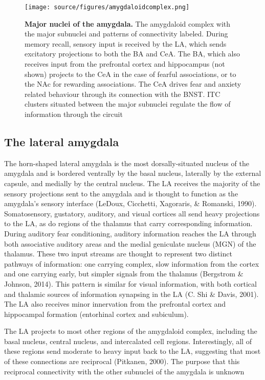 \documentclass[12pt,a4paperpaper,]{report}
\begin{document}
\begin{figure}[htbp]
\centering
\texttt{[image: source/figures/amygdaloidcomplex.png]}
\caption{\textbf{Major nuclei of the amygdala.} The amygdaloid complex
with the major subnuclei and patterns of connectivity labeled. During
memory recall, sensory input is received by the LA, which sends
excitatory projections to both the BA and CeA. The BA, which also
receives input from the prefrontal cortex and hippocampus (not shown)
projects to the CeA in the case of fearful associations, or to the NAc
for rewarding associations. The CeA drives fear and anxiety related
behaviour through its connection with the BNST. ITC clusters situated
between the major subnuclei regulate the flow of information through the
circuit \label{ref_a_figure}}
\end{figure}

\subsection{The lateral amygdala}\label{the-lateral-amygdala}

The horn-shaped lateral amygdala is the most dorsally-situated nucleus
of the amygdala and is bordered ventrally by the basal nucleus,
laterally by the external capsule, and medially by the central nucleus.
The LA receives the majority of the sensory projections sent to the
amygdala and is thought to function as the amygdala's sensory interface
(LeDoux, Cicchetti, Xagoraris, \& Romanski, 1990). Somatosensory,
gustatory, auditory, and visual cortices all send heavy projections to
the LA, as do regions of the thalamus that carry corresponding
information. During auditory fear conditioning, auditory information
reaches the LA through both associative auditory areas and the medial
geniculate nucleus (MGN) of the thalamus. These two input streams are
thought to represent two distinct pathways of information: one carrying
complex, slow information from the cortex and one carrying early, but
simpler signals from the thalamus (Bergstrom \& Johnson, 2014). This
pattern is similar for visual information, with both cortical and
thalamic sources of information synapsing in the LA (C. Shi \& Davis,
2001). The LA also receives minor innervation from the prefrontal cortex
and hippocampal formation (entorhinal cortex and subiculum).

The LA projects to most other regions of the amygdaloid complex,
including the basal nucleus, central nucleus, and intercalated cell
regions. Interestingly, all of these regions send moderate to heavy
input back to the LA, suggesting that most of these connections are
reciprocal (Pitkanen, 2000). The purpose that this reciprocal
connectivity with the other subnuclei of the amygdala is unknown
\end{document}
